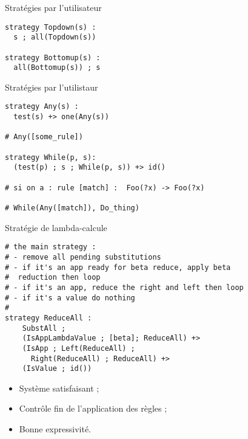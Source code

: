 \begin{frame}[fragile]{Stratégies par l'utilisateur}
\begin{verbatim}
strategy Topdown(s) :
  s ; all(Topdown(s))

strategy Bottomup(s) :
  all(Bottomup(s)) ; s
\end{verbatim}
\end{frame}

\begin{frame}[fragile]{Stratégies par l'utilistaur}
\begin{verbatim}
strategy Any(s) :
  test(s) +> one(Any(s))

# Any([some_rule])

strategy While(p, s):
  (test(p) ; s ; While(p, s)) +> id()

# si on a : rule [match] :  Foo(?x) -> Foo(?x)

# While(Any([match]), Do_thing)
\end{verbatim}

\end{frame}

\begin{frame}[fragile]{Stratégie de lambda-calcule}

\begin{verbatim}
# the main strategy : 
# - remove all pending substitutions
# - if it's an app ready for beta reduce, apply beta 
#  reduction then loop
# - if it's an app, reduce the right and left then loop
# - if it's a value do nothing
#
strategy ReduceAll :
    SubstAll ;
    (IsAppLambdaValue ; [beta]; ReduceAll) +>
    (IsApp ; Left(ReduceAll) ; 
      Right(ReduceAll) ; ReduceAll) +>
    (IsValue ; id())
\end{verbatim}

\end{frame}

\begin{frame}{}
\begin{itemize}
\item Système satisfaisant ;
\item Contrôle fin de l'application des règles ;
\item Bonne expressivité.
\end{itemize}
\end{frame}

